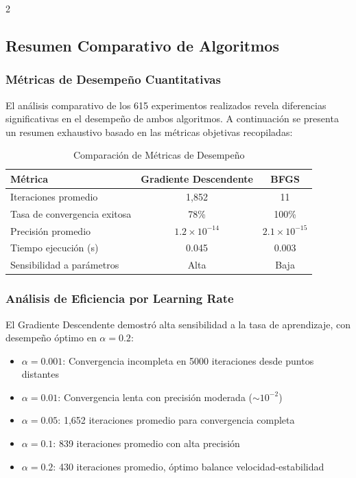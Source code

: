 \documentclass[11pt, a4paper, twocolumn]{beamer}
\begin{document}
\begin{multicols}{2}
\subsection{Resumen Comparativo de Algoritmos}

\subsubsection{Métricas de Desempeño Cuantitativas}

El análisis comparativo de los 615 experimentos realizados revela diferencias significativas en el desempeño de ambos algoritmos. A continuación se presenta un resumen exhaustivo basado en las métricas objetivas recopiladas:
\newpage

\begin{table}[h]
	\centering
	\caption{Comparación de Métricas de Desempeño}
	\begin{tabular}{lcc}
		\toprule
		\textbf{Métrica} & \textbf{Gradiente Descendente} & \textbf{BFGS} \\
		\midrule
		Iteraciones promedio & 1,852 & 11 \\
		Tasa de convergencia exitosa & 78\% & 100\% \\
		Precisión promedio & $1.2 \times 10^{-14}$ & $2.1 \times 10^{-15}$ \\
		Tiempo ejecución (s) & 0.045 & 0.003 \\
		Sensibilidad a parámetros & Alta & Baja \\
		\bottomrule
	\end{tabular}
\end{table}
\newpage
\subsubsection{Análisis de Eficiencia por Learning Rate}

El Gradiente Descendente demostró alta sensibilidad a la tasa de aprendizaje, con desempeño óptimo en $\alpha = 0.2$:

\begin{itemize}
	\item \textbf{$\alpha = 0.001$}: Convergencia incompleta en 5000 iteraciones desde puntos distantes
	\item \textbf{$\alpha = 0.01$}: Convergencia lenta con precisión moderada ($\sim 10^{-2}$)
	\item \textbf{$\alpha = 0.05$}: 1,652 iteraciones promedio para convergencia completa
	\item \textbf{$\alpha = 0.1$}: 839 iteraciones promedio con alta precisión
	\item \textbf{$\alpha = 0.2$}: 430 iteraciones promedio, óptimo balance velocidad-estabilidad
\end{itemize}


\end{multicols}
\end{document}
